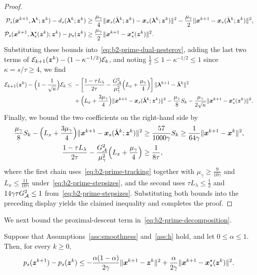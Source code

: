 \begin{proof}
\begin{align*}
    \mathcal P_s(\bm{x}^{k+1},\bm{\lambda}^k;\bm{z}^k)-d_s(\bm{\lambda}^k;\bm{z}^k)
    &\ge\frac{\mu_\gamma}{4}
    \|\bm{x}_s(\bar{\bm{\lambda}}^k;\bm{z}^k)-\bm{x}_s(\bm{\lambda}^k;\bm{z}^k)\|^2
    -\frac{\mu_\gamma}{2}\|\bm{x}^{k+1}-\bm{x}_s(\bar{\bm{\lambda}}^k;\bm{z}^k)\|^2,\\
    \mathcal P_s(\bm{x}^{k+1},\bm{\lambda}_s^\star(\bm{z}^k);\bm{z}^k)-p_s(\bm{z}^k)
    &\ge\frac{\mu_\gamma}{2}\|\bm{x}^{k+1}-\bm{x}_s^\star(\bm{z}^k)\|^2 .
\end{align*}
Substituting these bounds into~\eqref{eq:b2-prime-dual-nesterov},
adding the last two terms of
\(\mathcal E_{k+1}(\bm{z}^k)-(1-\kappa^{-1/2})\mathcal E_k\), and noting
\(\frac12\le1-\kappa^{-1/2}\le1\) since \(\kappa=s/\tau\ge4\), we find
\[
\begin{aligned}
    \mathcal E_{k+1}(\bm{z}^k)-\Bigl(1-\frac{1}{\sqrt{\kappa}}\Bigr)\mathcal E_k
    \le{}&-\left[\frac{1-\tau L_\lambda}{2\tau}
    -\frac{G_{\mathcal{A}}^2}{\mu_\gamma^2}
    \Bigl(L_x+\frac{\mu_\gamma}{4}\Bigr)\right]
    \|\bm{\lambda}^{k+1}-\bar{\bm{\lambda}}^k\|^2\\
    &+\Bigl(L_x+\frac{3\mu_\gamma}{4}\Bigr)
    \|\bm{x}^{k+1}-\bm{x}_s(\bar{\bm{\lambda}}^k;\bm{z}^k)\|^2
    -\frac{\mu_\gamma}{8}S_k
    -\frac{\mu_\gamma}{2\sqrt{\kappa}}\|\bm{x}^{k+1}-\bm{x}_s^\star(\bm{z}^k)\|^2 .
\end{aligned}
\]
Finally, we bound the two coefficients on the right-hand side by
\begin{align*}
    \frac{\mu_\gamma}{8}S_k
    -\Bigl(L_x+\frac{3\mu_\gamma}{4}\Bigr)
    \|\bm{x}^{k+1}-\bm{x}_s(\bar{\bm{\lambda}}^k;\bm{z}^k)\|^2
    &\ge\frac{57}{1000\gamma}S_k
    \ge\frac{1}{64\gamma}\|\bm{x}^{k+1}-\bm{x}^k\|^2,\\
    \frac{1-\tau L_\lambda}{2\tau}
    -\frac{G_{\mathcal{A}}^2}{\mu_\gamma^2}\Bigl(L_x+\frac{\mu_\gamma}{4}\Bigr)
    &\ge\frac{1}{8\tau},
\end{align*}
where the first chain uses~\eqref{eq:b2-prime-tracking} together with
\(\mu_\gamma\ge\frac{9}{10\gamma}\) and \(L_x\le\frac{11}{10\gamma}\)
under~\eqref{eq:b2-prime-stepsizes}, and the second uses
\(\tau L_\lambda\le\frac12\) and \(14\gamma\tau G_{\mathcal{A}}^2\le1\)
from~\eqref{eq:b2-prime-stepsizes}. Substituting both bounds into the preceding
display yields the claimed inequality and completes the proof.
\end{proof}

We next bound the proximal-descent term in~\eqref{eq:b2-prime-decomposition}.

\begin{lemma}
\label{lem:b2-prime-z-step-p}
Suppose that Assumptions~\ref{ass:smoothness} and~\ref{ass:h} hold, and let
\(0\le\alpha\le1\). Then, for every \(k\ge0\),
\[
    p_s(\bm{z}^{k+1})-p_s(\bm{z}^k)
    \le-\frac{\alpha(1-\alpha)}{2\gamma}\|\bm{x}^{k+1}-\bm{z}^k\|^2
    +\frac{\alpha}{2\gamma}\|\bm{x}^{k+1}-\bm{x}_s^\star(\bm{z}^k)\|^2 .
\]
\end{lemma}

